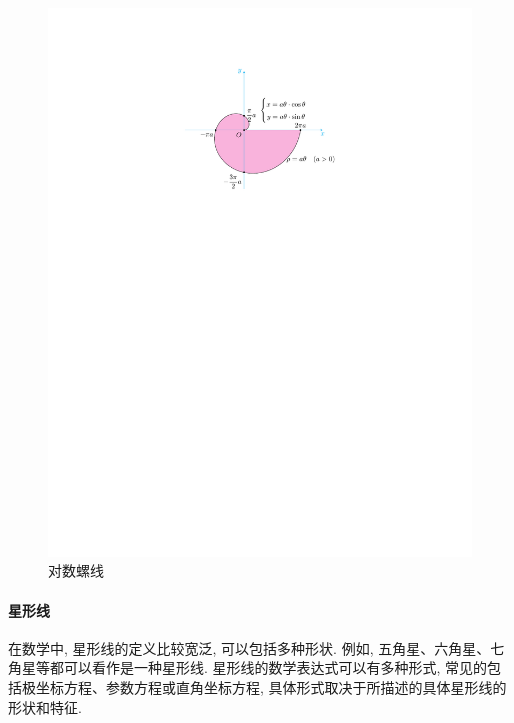 \begin{figure}[H]
    \centering
    \includegraphics{figures/ArchimedesSpiral.pdf}
    \caption{对数螺线}
    \label{archimedesSpiral}
\end{figure}

\paragraph{星形线}

在数学中, 星形线的定义比较宽泛, 可以包括多种形状. 例如, 五角星、六角星、七角星等都可以看作是一种星形线. 星形线的数学表达式可以有多种形式, 常见的包括极坐标方程、参数方程或直角坐标方程, 具体形式取决于所描述的具体星形线的形状和特征. 

